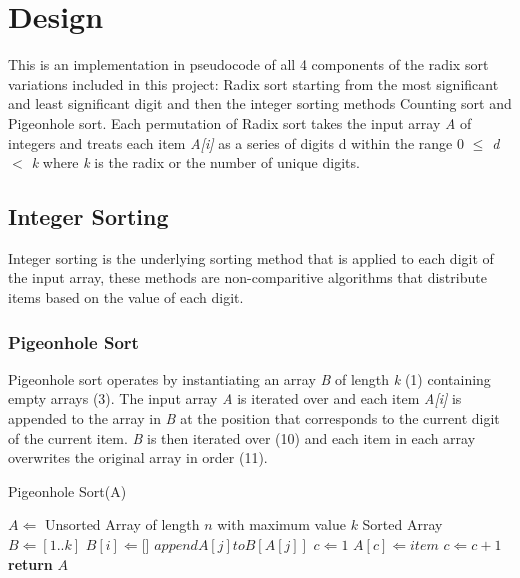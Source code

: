 \documentclass[12pt]{article}
\begin{document}
	\section{Design}
	This is an implementation in pseudocode of all 4 components of the radix sort variations included in this project: Radix sort starting from the most significant and least significant digit and then the integer sorting methods Counting sort and Pigeonhole sort. Each permutation of Radix sort takes the input array \textit{A} of integers and treats each item \textit{A[i]} as a series of digits d within the range 0 \textit{$\leq$ d $<$ k} where \textit{k} is the radix or the number of unique digits. 
	\subsection{Integer Sorting}
	Integer sorting is the underlying sorting method that is applied to each digit of the input array, these methods are non-comparitive algorithms that distribute items based on the value of each digit. 
	\subsubsection{Pigeonhole Sort}
	Pigeonhole sort operates by instantiating an array \textit{B} of length \textit{k} (1) containing empty arrays (3). The input array \textit{A} is iterated over and each item \textit{A[i]} is appended to the array in \textit{B} at the position that corresponds to the current digit of the current item. \textit{B} is then iterated over (10) and each item in each array overwrites the original array in order (11). 
	\begin{algorithm}[H] %
		\caption{Pigeonhole Sort({A})} %
		\label{alg1} %
		\begin{algorithmic}[1] %
			\REQUIRE $A \Leftarrow$ Unsorted Array of length $n$ with maximum value $k$
			\ENSURE Sorted Array
			\STATE $B \Leftarrow [1..k]$ 
			\STATE $B[i] \Leftarrow [$\space$]$ 
			\ENDFOR
			\STATE $append$\space$ A[j]$\space$ to$\space$ B[A[j]]$ 
			\ENDFOR
			\STATE $c \Leftarrow 1$ 
			\STATE $A[c] \Leftarrow item$ 
			\STATE $c \Leftarrow c + 1$
			\ENDFOR
			\ENDFOR
			\STATE \textbf{return} $A$
		\end{algorithmic}
	\end{algorithm}
\end{document}
